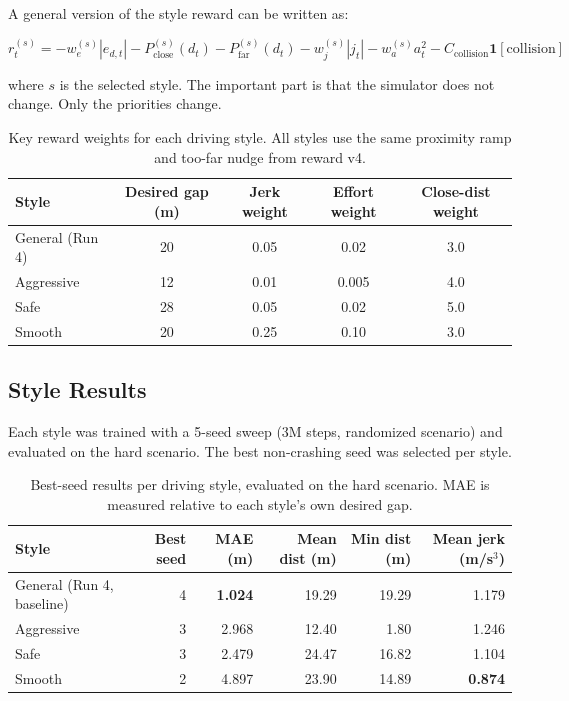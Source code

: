 \documentclass{article}
\begin{document}
A general version of the style reward can be written as:

\[
r_t^{(s)}
=
-w_e^{(s)}|e_{d,t}|
-P_{\mathrm{close}}^{(s)}(d_t)
-P_{\mathrm{far}}^{(s)}(d_t)
-w_j^{(s)}|j_t|
-w_a^{(s)}a_t^2
-C_{\mathrm{collision}}\mathbf{1}[\mathrm{collision}]
\]

where $s$ is the selected style. The important part is that the simulator does not change. Only the priorities change.

\begin{table}[H]
\centering
\small
\begin{tabular}{lcccc}
\toprule
Style & Desired gap (m) & Jerk weight & Effort weight & Close-dist weight \\
\midrule
General (Run 4) & 20 & 0.05 & 0.02 & 3.0 \\
Aggressive      & 12 & 0.01 & 0.005 & 4.0 \\
Safe            & 28 & 0.05 & 0.02 & 5.0 \\
Smooth          & 20 & 0.25 & 0.10 & 3.0 \\
\bottomrule
\end{tabular}
\caption{Key reward weights for each driving style. All styles use the same proximity ramp and too-far nudge from reward v4.}
\label{tab:style_weights}
\end{table}

\subsection*{Style Results}

Each style was trained with a 5-seed sweep (3M steps, randomized scenario) and evaluated on the hard scenario. The best non-crashing seed was selected per style.

\begin{table}[H]
\centering
\small
\begin{tabular}{lrrrrr}
\toprule
Style & Best seed & MAE (m) & Mean dist (m) & Min dist (m) & Mean jerk (m/s$^3$) \\
\midrule
General (Run 4, baseline) & 4 & \textbf{1.024} & 19.29 & 19.29 & 1.179 \\
Aggressive & 3 & 2.968 & 12.40 & 1.80  & 1.246 \\
Safe       & 3 & 2.479 & 24.47 & 16.82 & 1.104 \\
Smooth     & 2 & 4.897 & 23.90 & 14.89 & \textbf{0.874} \\
\bottomrule
\end{tabular}
\caption{Best-seed results per driving style, evaluated on the hard scenario. MAE is measured relative to each style's own desired gap.}
\label{tab:style_results}
\end{table}
\end{document}
